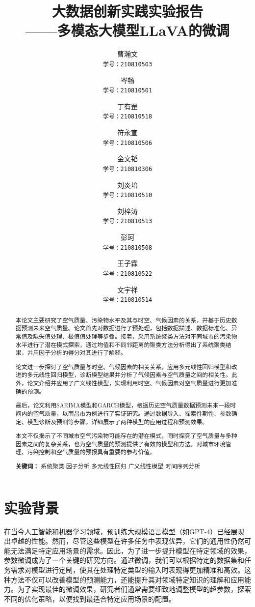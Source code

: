 \documentclass[
    linespread = 1.25
]{ctexart}
\title{\zihao{2}\textbf{大数据创新实践实验报告}\\\zihao{3}\textbf{——多模态大模型LLaVA的微调}}
\author{\zihao{4}曹瀚文 \\\texttt{学号：210810503}
\and \zihao{4}岑畅 \\\texttt{学号：210810501}
\and \zihao{4}丁有罡 \\\texttt{学号：210810518}
\and \zihao{4}符永宣\\\texttt{学号：210810506}
\and \zihao{4}金文韬\\\texttt{学号：210810306}
\and \zihao{4}刘炎培\\\texttt{学号：210810510}
\and \zihao{4}刘梓涛\\\texttt{学号：210810513}
\and \zihao{4}彭珂\\\texttt{学号：210810508}
\and \zihao{4}王子霖\\\texttt{学号：210810522}
\and \zihao{4}文宇祥\\\texttt{学号：210810514}
}
\date{}
\begin{document}
\begin{titlepage}
  \maketitle
  \vspace{0.2cm}
  \begin{abstract}
    \vspace{0.8cm}
    \linespread{1.25}
    本论文主要研究了空气质量、污染物水平及其与时空、气候因素的关系，并基于历史数据预测未来空气质量。论文首先对数据进行了预处理，包括数据描述、数据标准化、异常值及缺失值处理、极值值处理等步骤。接着，采用系统聚类方法对不同城市的污染物水平进行了潜在模式探索，通过均值和不同邻距离的聚类方法分析得出了系统聚类结果，并用因子分析的得分对其进行了解释。

    论文进一步探讨了空气质量与时空、气候因素的相关关系，应用多元线性回归模型和改进的多元线性回归模型，诊断模型结果并分析了气候因素与空气质量之间的相关性。此外，论文介绍并应用了广义线性模型，实现利用时空、气候因素对空气质量进行更加准确的预测。

    最后，论文利用SARIMA模型和GARCH模型，根据历史空气质量数据预测未来一段时间内的空气质量，以南昌市为例进行了实证研究。通过数据导入、探索性期性、参数确定、模型诊断及预测等步骤，详细展示了两种模型的应用过程和预测效果。

    本文不仅揭示了不同城市空气污染物可能存在的潜在模式，同时探究了空气质量与多种因素之间的复杂关系，也为空气质量的预测提供了有效的模型和方法，对城市环境管理、污染控制和空气质量的预报具有重要的参考价值。

    \vspace{1cm}
    \noindent\textbf{关键词：} 系统聚类\hspace{0.22cm} 因子分析\hspace{0.22cm} 多元线性回归\hspace{0.22cm} 广义线性模型\hspace{0.22cm} 时间序列分析
  \end{abstract}
\end{titlepage}

\tableofcontents
\newpage
\section{实验背景}
在当今人工智能和机器学习领域，预训练大规模语言模型（如GPT-4）已经展现出卓越的性能。然而，尽管这些模型在许多任务中表现优异，它们的通用性仍然可能无法满足特定应用场景的需求。因此，为了进一步提升模型在特定领域的效果，参数微调成为了一个关键的研究方向。通过微调，我们可以根据特定的数据集和任务需求对模型进行定制，使其在处理特定类型的输入时表现得更加精准和高效。这种方法不仅可以改善模型的预测能力，还能提升其对领域特定知识的理解和应用能力。为了实现最佳的微调效果，研究者们通常需要细致地调整模型的超参数，探索不同的优化策略，以便找到最适合特定应用场景的配置。
\end{document}
